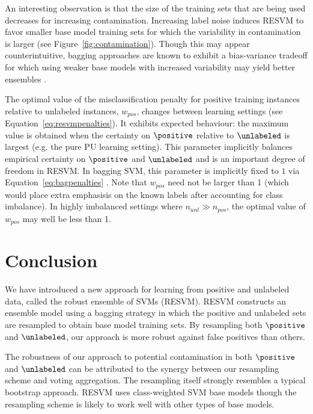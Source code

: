 An interesting observation is that the size of the training sets that are being used decreases for increasing contamination. Increasing label noise induces RESVM to favor smaller base model training sets for which the variability in contamination is larger (see Figure~\ref{fig:contamination}). Though this may appear counterintuitive, bagging approaches are known to exhibit a bias-variance tradeoff \citep{bauer1999empirical} for which using weaker base models with increased variability may yield better ensembles \citep{biasvariance}.

The optimal value of the misclassification penalty for positive training instances relative to unlabeled instances, $w_{pos}$, changes between learning settings (see Equation~\eqref{eq:resvmpenalties}). It exhibits expected behaviour: the maximum value is obtained when the certainty on $\positive$ relative to $\unlabeled$ is largest (e.g. the pure PU learning setting). This parameter implicitly balances empirical certainty on $\positive$ and $\unlabeled$ and is an important degree of freedom in RESVM. In bagging SVM, this parameter is implicitly fixed to $1$ via Equation~\eqref{eq:bagpenalties} \citep{MORDELET-2010-523336}. Note that $w_{pos}$ need not be larger than 1 (which would place extra emphasisis on the known labels after accounting for class imbalance). In highly imbalanced settings where $n_{unl} \gg n_{pos}$, the optimal value of $w_{pos}$ may well be less than 1.


\section{Conclusion}
We have introduced a new approach for learning from positive and unlabeled data, called the robust ensemble of SVMs (RESVM). RESVM constructs an ensemble model using a bagging strategy in which the positive and unlabeled sets are resampled to obtain base model training sets. By resampling both $\positive$ and $\unlabeled$, our approach is more robust against false positives than others.

The robustness of our approach to potential contamination in both $\positive$ and $\unlabeled$ can be attributed to the synergy between our resampling scheme and voting aggregation. The resampling itself strongly resembles a typical bootstrap approach. RESVM uses class-weighted SVM base models though the resampling scheme is likely to work well with other types of base models.

